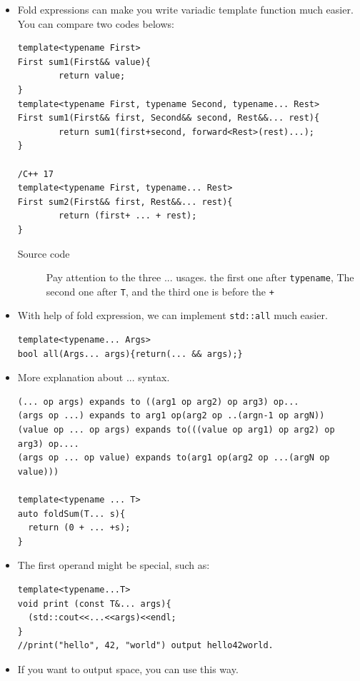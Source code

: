 \documentclass[a4paper,11pt,twoside]{book}
\begin{document}
\begin{itemize}

    \item Fold expressions can make you write variadic template function much easier. You can compare two codes belows:

\begin{lstlisting}
template<typename First>
First sum1(First&& value){
		return value;
}
template<typename First, typename Second, typename... Rest>
First sum1(First&& first, Second&& second, Rest&&... rest){
		return sum1(first+second, forward<Rest>(rest)...);
}

/C++ 17
template<typename First, typename... Rest>
First sum2(First&& first, Rest&&... rest){
		return (first+ ... + rest);
}
\end{lstlisting}
\begin{description}
	\item[Source code] Pay attention to the three ... usages. the first one after \texttt{typename}, The second one after \texttt{T}, and the third one is before the \texttt{+}
\end{description}	

    \item With help of fold expression, we can implement \texttt{std::all} much easier.
\begin{lstlisting}
template<typename... Args>
bool all(Args... args){return(... && args);}
\end{lstlisting}

    \item More explanation about ... syntax.
\begin{lstlisting}
(... op args) expands to ((arg1 op arg2) op arg3) op...
(args op ...) expands to arg1 op(arg2 op ..(argn-1 op argN))
(value op ... op args) expands to(((value op arg1) op arg2) op arg3) op....
(args op ... op value) expands to(arg1 op(arg2 op ...(argN op value)))

template<typename ... T>
auto foldSum(T... s){
  return (0 + ... +s); 
} 
\end{lstlisting}
    \item The first operand might be special, such as:
\begin{lstlisting}
template<typename...T>
void print (const T&... args){
  (std::cout<<...<<args)<<endl;
}
//print("hello", 42, "world") output hello42world.
\end{lstlisting}

    \item If you want to output space, you can use this way.


\end{itemize}
\end{document}
